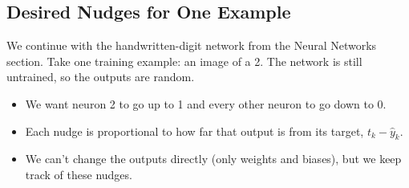 \subsection*{Desired Nudges for One Example}
\begin{keeptogether}
We continue with the handwritten-digit network from the Neural Networks section. Take one training example: an image of a 2. The network is still untrained, so the outputs are random.
\begin{itemize}
  \item We want neuron 2 to go up to 1 and every other neuron to go down to 0.
  \item Each nudge is proportional to how far that output is from its target, $t_k - \hat{y}_k$.
  \item We can't change the outputs directly (only weights and biases), but we keep track of these nudges.
\end{itemize}


\end{keeptogether}

